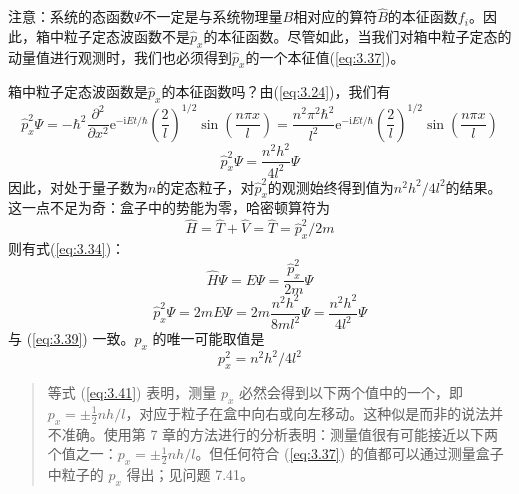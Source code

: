 	注意：系统的态函数$\Psi$不一定是与系统物理量$B$相对应的算符$\hat{B}$的本征函数$f_i$。因此，箱中粒子定态波函数不是$\hat{p}_x$的本征函数。尽管如此，当我们对箱中粒子定态的动量值进行观测时，我们也必须得到$\hat{p}_x$的一个本征值(\ref{eq:3.37})。

	箱中粒子定态波函数是$\hat{p}_x$的本征函数吗？由(\ref{eq:3.24})，我们有
	\begin{equation*}
		\hat{p}_x^2\Psi = -\hbar^2\frac{\partial^2}{\partial x^2}\mathrm{e}^{-\mathrm{i}Et/\hbar}\left(\frac{2}{l}\right)^{1/2}\sin\left(\frac{n\pi x}{l}\right) = \frac{n^2\pi^2 \hbar^2}{l^2}\mathrm{e}^{-\mathrm{i}Et/\hbar}\left(\frac{2}{l}\right)^{1/2}\sin\left(\frac{n\pi x}{l}\right)
	\end{equation*}
	\begin{equation}
		\hat{p}_x^2\Psi = \frac{n^2h^2}{4l^2}\Psi
		\label{eq:3.39}
	\end{equation}
	因此，对处于量子数为$n$的定态粒子，对$\hat{p}_x^2$的观测始终得到值为$n^2h^2/4l^2$的结果。这一点不足为奇：盒子中的势能为零，哈密顿算符为
	\begin{equation*}
		\hat{H} = \hat{T}+ \hat{V} = \hat{T} = \hat{p}_x^2/2m
	\end{equation*}
	则有式(\ref{eq:3.34})：
	\begin{equation*}
		\hat{H}\Psi = E\Psi = \frac{\hat{p}_x^2}{2m}\Psi
	\end{equation*}
	\begin{equation}
		\hat{p}_x^2\Psi = 2mE\Psi = 2m\frac{n^2h^2}{8ml^2}\Psi = \frac{n^2h^2}{4l^2}\Psi
		\label{eq:3.40}
	\end{equation}
	与 (\ref{eq:3.39}) 一致。$p_x$ 的唯一可能取值是
	\begin{equation}
		p_x^2 = n^2h^2 / 4l^2
		\label{eq:3.41}
	\end{equation}
	\begin{quote}
		\small %
		\noindent %
		等式 (\ref{eq:3.41}) 表明，测量 $p_x$ 必然会得到以下两个值中的一个，即$p_x = \pm \frac{1}{2}nh/l$，对应于粒子在盒中向右或向左移动。这种似是而非的说法并不准确。使用第 7 章的方法进行的分析表明：测量值很有可能接近以下两个值之一：$p_x = \pm \frac{1}{2}nh/l$。但任何符合 (\ref{eq:3.37}) 的值都可以通过测量盒子中粒子的 $p_x$ 得出；见问题 7.41。
	\end{quote}


